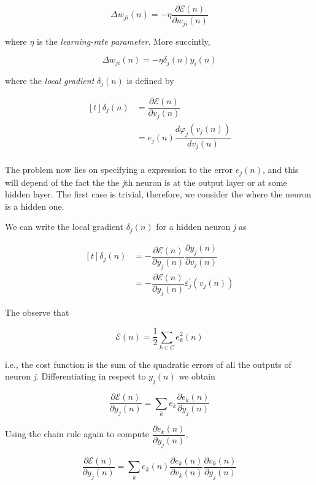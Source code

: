 \documentclass[twocolumn]{article}
\begin{document}
	$$ \Delta w_{ji} (n) = -\eta \dfrac{\partial \mathcal{E} (n)}{\partial w_{ji} (n)} $$

	\noindent where $ \eta $ is the \textit{learning-rate parameter}. More succintly,

	$$ \Delta w_{ji} (n) = - \eta \delta_{j} (n) y_{i} (n) $$

	\noindent where the \textit{local gradient} $ \delta_{j} (n) $ is defined by

	$$ \begin{aligned}[t]
			\delta_{j} (n) & = \dfrac{\partial \mathcal{E} (n)}{\partial v_{j} (n)}     \\
			               & = e_{j} (n) \dfrac{d \varphi_{j} (v_{j} (n))}{d v_{j} (n)} \\
		\end{aligned} $$

	The problem now lies on specifying a expression to the error $ e_{j} (n) $, and this will depend of the fact the the \textit{j}th neuron is at the output layer or at some hidden layer. The first case is trivial, therefore, we consider the where the neuron is a hidden one.

	We can write the local gradient $ \delta_{j} (n) $ for a hidden neuron \textit{j} as

	$$ \begin{aligned}[t]
			\delta_{j} (n) & = - \dfrac{\partial \mathcal{E} (n)}{\partial y_{j} (n)} \dfrac{\partial y_{j} (n)}{\partial v_{j} (n)} \\
			               & = - \dfrac{\partial \mathcal{E} (n)}{\partial y_{j} (n)} \varepsilon^{'}_{j} ( v_{j} (n))
		\end{aligned} $$

	The observe that

	$$ \mathcal{E} (n) = \dfrac{1}{2} \sum_{k \in C} e_{k}^{2} (n)$$

	\noindent i.e., the cost function is the sum of the quadratic errors of all the outputs of neuron \textit{j}. Differentiating in respect to $ y_{j} (n) $ we obtain

	$$ \dfrac{\partial \mathcal{E} (n)}{\partial y_{j} (n)} = \sum_{k} e_{k} \dfrac{\partial e_{k} (n)}{\partial y_{j} (n)} $$

	Using the chain rule again to compute $\dfrac{\partial e_{k} (n)}{\partial y_{j} (n)} $,

	$$ \dfrac{\partial \mathcal{E} (n)}{\partial y_{j} (n)} = \sum_{k} e_{k} (n) \dfrac{\partial e_{k} (n)}{\partial v_{k} (n)} \dfrac{\partial v_{k} (n)}{\partial y_{j} (n)} $$
\end{document}
